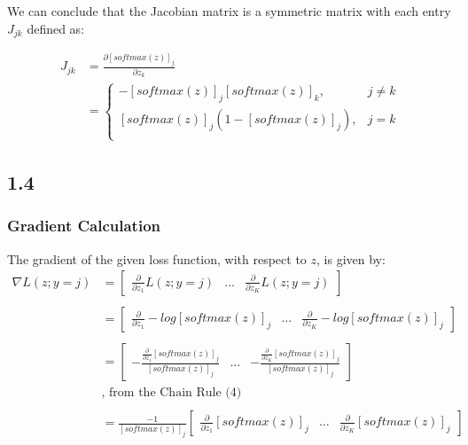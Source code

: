 \documentclass[10pt]{article}
\newcommand{\softmax}[1]{ [softmax(z)]_{#1} }
\newcommand{\pz}[1]{ \frac{\partial}{\partial z_{#1}}}
\begin{document}
We can conclude that the Jacobian matrix is a symmetric matrix with each entry $J_{jk}$ defined as:

\begin{equation}
\begin{aligned}
  J_{jk} {} &= \frac{\partial [softmax(z)]_{j}}{\partial z_{k}} \\
			&= \begin{cases}
	    -[softmax(z)]_{j} [softmax(z)]_{k},& j \neq k \\
	    [softmax(z)]_{j} (1 - [softmax(z)]_{j}),& j = k \\
    \end{cases}
\end{aligned}
\end{equation}

\subsection{1.4}

\subsubsection{Gradient Calculation}
The gradient of the given loss function, with respect to $z$, is given by:
\begin{equation}
\begin{aligned}
  \nabla L(z; y=j) {} & = \left[\begin{matrix}
			\pz{1}L(z; y=j) & \dots & \pz{K}L(z;y=j)
		\end{matrix}\right]
  \\ \\ &
  = \left[\begin{matrix}
			\pz{1}-log\softmax{j}
			& \dots
			& \pz{K}-log\softmax{j}
		\end{matrix}\right]
  \\ \\ &
  = \left[\begin{matrix}
		-\frac{\pz{1}\softmax{j}}{\softmax{j}}
		& \dots
		& -\frac{\pz{K}\softmax{j}}{\softmax{j}}
		\end{matrix}\right] \\
		&\text{, from the Chain Rule (4)}
  \\ \\ &
  = \frac{-1}{\softmax{j}}\left[\begin{matrix}
		\pz{1}\softmax{j}
		& \dots
		& \pz{K}\softmax{j}
		\end{matrix}\right]
\end{aligned}
\end{equation}
\end{document}
